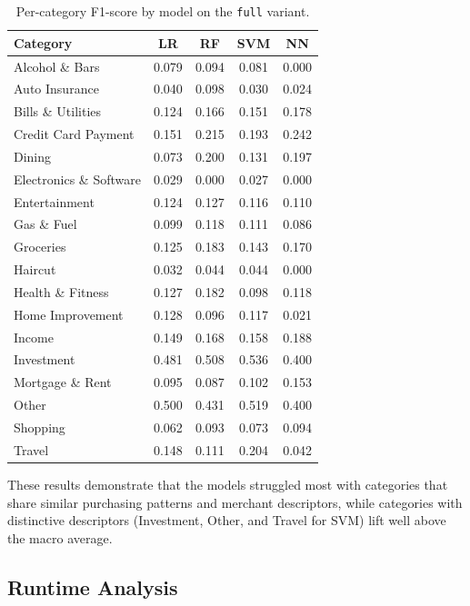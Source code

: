 \documentclass[11pt]{article}
\begin{document}
\begin{table}[!htbp]
\centering
\caption{Per-category F1-score by model on the \texttt{full} variant.}
\label{tab:per-category}
\small
\begin{tabular}{lcccc}
\toprule
Category & LR & RF & SVM & NN \\
\midrule
Alcohol \& Bars         & 0.079 & 0.094 & 0.081 & 0.000 \\
Auto Insurance          & 0.040 & 0.098 & 0.030 & 0.024 \\
Bills \& Utilities      & 0.124 & 0.166 & 0.151 & 0.178 \\
Credit Card Payment     & 0.151 & 0.215 & 0.193 & 0.242 \\
Dining                  & 0.073 & 0.200 & 0.131 & 0.197 \\
Electronics \& Software & 0.029 & 0.000 & 0.027 & 0.000 \\
Entertainment           & 0.124 & 0.127 & 0.116 & 0.110 \\
Gas \& Fuel             & 0.099 & 0.118 & 0.111 & 0.086 \\
Groceries               & 0.125 & 0.183 & 0.143 & 0.170 \\
Haircut                 & 0.032 & 0.044 & 0.044 & 0.000 \\
Health \& Fitness       & 0.127 & 0.182 & 0.098 & 0.118 \\
Home Improvement        & 0.128 & 0.096 & 0.117 & 0.021 \\
Income                  & 0.149 & 0.168 & 0.158 & 0.188 \\
Investment              & 0.481 & 0.508 & 0.536 & 0.400 \\
Mortgage \& Rent        & 0.095 & 0.087 & 0.102 & 0.153 \\
Other                   & 0.500 & 0.431 & 0.519 & 0.400 \\
Shopping                & 0.062 & 0.093 & 0.073 & 0.094 \\
Travel                  & 0.148 & 0.111 & 0.204 & 0.042 \\
\bottomrule
\end{tabular}
\end{table}

These results demonstrate that the models struggled most with categories
that share similar purchasing patterns and merchant descriptors, while
categories with distinctive descriptors (Investment, Other, and Travel
for SVM) lift well above the macro average.

\subsection{Runtime Analysis}
\end{document}
